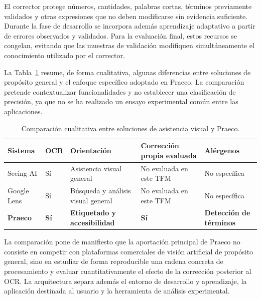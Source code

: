 El corrector protege números, cantidades, palabras cortas, términos previamente validados y otras expresiones que no deben modificarse sin evidencia suficiente. Durante la fase de desarrollo se incorpora además aprendizaje adaptativo a partir de errores observados y validados. Para la evaluación final, estos recursos se congelan, evitando que las muestras de validación modifiquen simultáneamente el conocimiento utilizado por el corrector.

La Tabla~\ref{tab:comparativa_ocr} resume, de forma cualitativa, algunas diferencias entre soluciones de propósito general y el enfoque específico adoptado en Praeco. La comparación pretende contextualizar funcionalidades y no establecer una clasificación de precisión, ya que no se ha realizado un ensayo experimental común entre las aplicaciones.

\begin{table}[htbp]
    \centering
    \caption{Comparación cualitativa entre soluciones de asistencia visual y Praeco.}
    \label{tab:comparativa_ocr}
    \renewcommand{\arraystretch}{1.25}
    \begin{tabularx}{\textwidth}{@{}lXXXX@{}}
        \toprule
        \textbf{Sistema} & \textbf{OCR} & \textbf{Orientación} & \textbf{Corrección propia evaluada} & \textbf{Alérgenos} \\
        \midrule
        Seeing AI \cite{seeingai} & Sí & Asistencia visual general & No evaluada en este TFM & No específica \\
        Google Lens \cite{googlelens} & Sí & Búsqueda y análisis visual general & No evaluada en este TFM & No específica \\
        \textbf{Praeco} & \textbf{Sí} & \textbf{Etiquetado y accesibilidad} & \textbf{Sí} & \textbf{Detección de términos} \\
        \bottomrule
    \end{tabularx}
\end{table}

La comparación pone de manifiesto que la aportación principal de Praeco no consiste en competir con plataformas comerciales de visión artificial de propósito general, sino en estudiar de forma reproducible una cadena concreta de procesamiento y evaluar cuantitativamente el efecto de la corrección posterior al OCR. La arquitectura separa además el entorno de desarrollo y aprendizaje, la aplicación destinada al usuario y la herramienta de análisis experimental.

